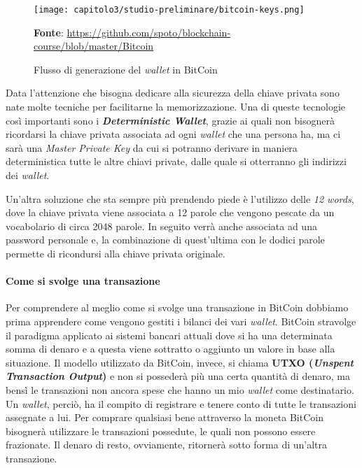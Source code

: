 \begin{figure}[tbh!]
  \centering
  \texttt{[image: capitolo3/studio-preliminare/bitcoin-keys.png]}
  \caption{Flusso di generazione del \textit{wallet} in BitCoin}
  \textbf{Fonte}: \href{https://github.com/spoto/blockchain-course/blob/master/Bitcoin}{https://github.com/spoto/blockchain-course/blob/master/Bitcoin}
\end{figure}

Data l'attenzione che bisogna dedicare alla sicurezza della chiave privata sono nate molte tecniche per facilitarne la memorizzazione. Una di queste tecnologie così importanti sono i \textit{\textbf{Deterministic Wallet}}, grazie ai quali non bisognerà ricordarsi la chiave privata associata ad ogni \textit{wallet} che una persona ha, ma ci sarà una \textit{Master Private Key} da cui si potranno derivare in maniera deterministica tutte le altre chiavi private, dalle quale si otterranno gli indirizzi dei \textit{wallet}. 

Un'altra soluzione che sta sempre più prendendo piede è l'utilizzo delle \textit{12 words}, dove la chiave privata viene associata a 12 parole che vengono pescate da un vocabolario di circa 2048 parole. In seguito verrà anche associata ad una password personale e, la combinazione di quest'ultima con le dodici parole permette di ricondursi alla chiave privata originale. 

\paragraph{Come si svolge una transazione}
Per comprendere al meglio come si svolge una transazione in BitCoin dobbiamo prima apprendere come vengono gestiti i bilanci dei vari \textit{wallet}. BitCoin stravolge il paradigma applicato ai sistemi bancari attuali dove si ha una determinata somma di denaro e a questa viene sottratto o aggiunto un valore in base alla situazione. Il modello utilizzato da BitCoin, invece, si chiama \textbf{UTXO (\textit{Unspent Transaction Output})} e non si possederà più una certa quantità di denaro, ma bensì le transazioni non ancora spese che hanno un mio \textit{wallet} come destinatario. Un \textit{wallet}, perciò, ha il compito di registrare e tenere conto di tutte le transazioni assegnate a lui. Per comprare qualsiasi bene attraverso la moneta BitCoin bisognerà utilizzare le transazioni possedute, le quali non possono essere frazionate. Il denaro di resto, ovviamente, ritornerà sotto forma di un'altra transazione.

